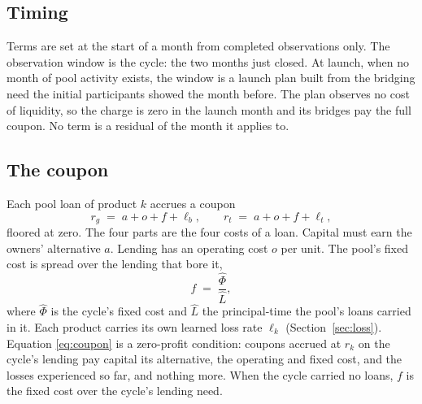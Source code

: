 \documentclass[10pt,a4paper]{article}
\theoremstyle{remark}
\newcommand{\cyc}[1]{\widehat{#1}}
\begin{document}
\subsection{Timing}
Terms are set at the start of a month from completed observations only. The
observation window is the cycle: the two months just closed. At launch, when
no month of pool activity exists, the window is a launch plan built from the
bridging need the initial participants showed the month before. The plan
observes no cost of liquidity, so the charge is zero in the launch month and
its bridges pay the full coupon. No term is a residual of the
month it applies to.

\subsection{The coupon}
Each pool loan of product \(k\) accrues a coupon
\begin{equation}
r_g \;=\; a+o+f+\ell_b ,\qquad r_t \;=\; a+o+f+\ell_t ,
\label{eq:coupon}
\end{equation}
floored at zero. The four parts are the four costs of a loan. Capital must
earn the owners' alternative \(a\). Lending has an operating cost \(o\) per
unit. The pool's fixed cost is spread over the lending that bore it,
\begin{equation}
f \;=\; \frac{\cyc\Phi}{\cyc L},
\label{eq:fixed}
\end{equation}
where \(\cyc\Phi\) is the cycle's fixed cost and \(\cyc L\) the
principal-time the pool's loans carried in it. Each product carries its
own learned loss rate \(\ell_k\) (Section~\ref{sec:loss}). Equation
\eqref{eq:coupon} is a zero-profit condition: coupons accrued at \(r_k\) on the
cycle's lending pay capital its alternative, the operating and fixed cost, and
the losses experienced so far, and nothing more. When the cycle carried no
loans, \(f\) is the fixed cost over the cycle's lending need.
\end{document}
